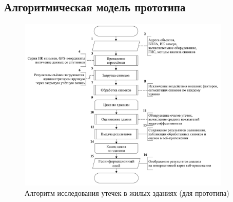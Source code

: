 \pagebreak

\subsection{Алгоритмическая модель прототипа}
\label{sec:models:algo:before}

	\begin{figure}[h!]
      \centering
      \includegraphics[width=0.9\textwidth]{images/am/am0_before}
      \caption{Алгоритм исследования утечек в жилых зданиях (для прототипа)}
      \label{am:before:common}
    \end{figure}

\pagebreak

